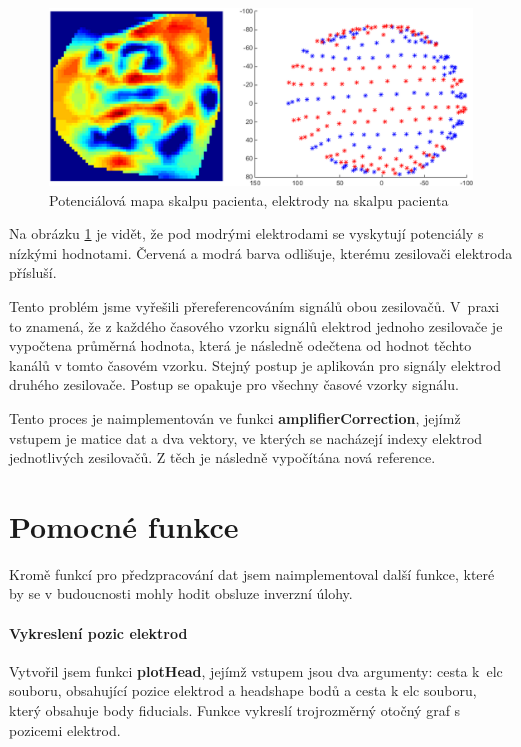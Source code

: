 \begin{figure}[!h]
\includegraphics[width=1.0\textwidth]{casti/implementace/opravazesilovacu.png}
\caption{Potenciálová mapa skalpu pacienta, elektrody na skalpu pacienta}
\label{opravazesilovacu}
\end{figure}

Na obrázku \ref{opravazesilovacu} je vidět, že pod modrými elektrodami se vyskytují potenciály s nízkými hodnotami. Červená a modrá barva odlišuje, kterému zesilovači elektroda přísluší.

Tento problém jsme vyřešili přereferencováním signálů obou zesilovačů. V~praxi to znamená, že z každého časového vzorku signálů elektrod jednoho zesilovače je vypočtena průměrná hodnota, která je následně odečtena od hodnot těchto kanálů v tomto časovém vzorku. Stejný postup je aplikován pro signály elektrod druhého zesilovače. Postup se opakuje pro všechny časové vzorky signálu.

Tento proces je naimplementován ve funkci \textbf{amplifierCorrection}, jejímž vstupem je matice dat a dva vektory, ve kterých se nacházejí indexy elektrod jednotlivých zesilovačů. Z těch je následně vypočítána nová reference.



\section{Pomocné funkce}
Kromě funkcí pro předzpracování dat jsem naimplementoval další funkce, které by se v budoucnosti mohly hodit obsluze inverzní úlohy.

\paragraph{Vykreslení pozic elektrod}
Vytvořil jsem funkci \textbf{plotHead}, jejímž vstupem jsou dva argumenty: cesta k~elc souboru, obsahující pozice elektrod a headshape bodů a cesta k elc souboru, který obsahuje body fiducials. Funkce vykreslí trojrozměrný otočný graf s pozicemi elektrod.

